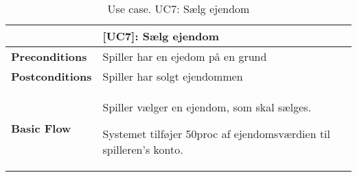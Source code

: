 \documentclass[class=article, crop=false]{standalone}
\begin{document}
    \begin{table}[H]
        \caption{Use case. UC7: Sælg ejendom}
        \begin{tabularx}{\textwidth}{|l|X|}
            \hline
            & \textbf{[UC7]: Sælg ejendom}   \\ \hline
            \textbf{Preconditions}       & Spiller har en ejedom på en grund\\ \hline
            \textbf{Postconditions}      & Spiller har solgt ejendommen\\ \hline


            \textbf{Basic Flow} & \begin{tabenum}
                                      \item Spiller vælger en ejendom, som skal sælges.
                                      \item Systemet tilføjer 50proc af ejendomsværdien til spilleren's konto.
            \end{tabenum}   \\ \hline

        \end{tabularx}


    \end{table}
\end{document}
